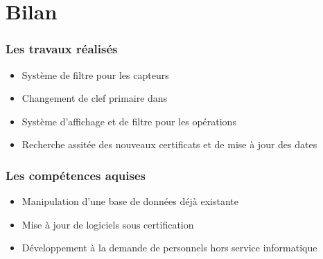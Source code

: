 \section{Bilan}

\begin{frame} 
    \frametitle{Les travaux réalisés}
    \begin{itemize}
        \item<2-> Système de filtre pour les capteurs
        \item<2-> Changement de clef primaire dans 
        \bigskip
        \item<3-> Système d'affichage et de filtre pour les opérations
        \item<3-> Recherche assitée des nouveaux certificats et de mise à jour des dates
    \end{itemize}
\end{frame}

\begin{frame} 
    \frametitle{Les compétences aquises}
    \begin{itemize}
        \item<2-> \alert<2>{Manipulation d'une base de données déjà existante}
        \item<3-> \alert<3>{Mise à jour de logiciels sous certification }
        \item<4-> \alert<4>{Développement à la demande de personnels hors service informatique}
    \end{itemize}
\end{frame}